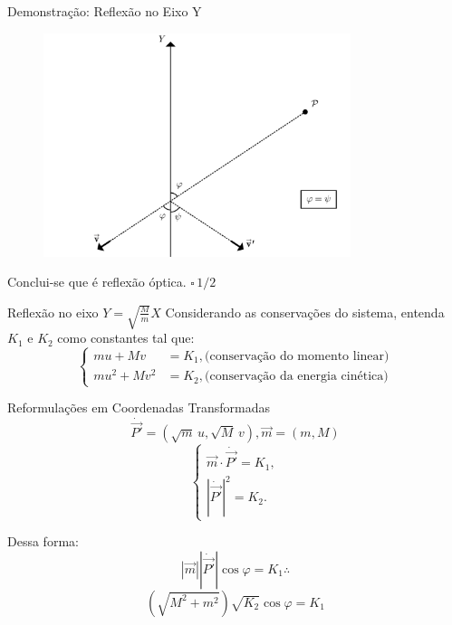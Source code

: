 \documentclass{beamer}
\begin{document}
\begin{frame}{Demonstração: Reflexão no Eixo Y}
  \begin{figure}
    \centering
    \includegraphics[width=0.8\textwidth]{images/image-4.png}
  \end{figure}
  Conclui-se que é reflexão óptica. $\square \, 1/2$ 
\end{frame}

\begin{frame}{Reflexão no eixo $Y=\sqrt{\tfrac{M}{m}}X$}
  Considerando as conservações do sistema, entenda $K_1$ e $K_2$ como constantes tal que:
  \begin{equation*}
    \begin{cases}mu+Mv&=K_1,\text{(conservação do momento linear)} \\mu^2+Mv^2&=K_2,\text{(conservação da energia cinética)} \end{cases}
  \end{equation*}
\end{frame}

\begin{frame}{Reformulações em Coordenadas Transformadas}
  $$\dot{\vec{P'}}=(\sqrt m\,u,\sqrt M\,v), \vec m=(m,M)$$
  \begin{equation*}
    \begin{cases}\vec m\cdot\dot{\vec{P'}}=K_1,\\|\dot{\vec{P'}}|^2=K_2.\end{cases}
  \end{equation*}

  Dessa forma:
  $$|\vec{m}| |\dot{\vec{P'}}| \cos{\varphi} = K_1 \therefore$$
  $$(\sqrt{M^2+m^2}) \sqrt{K_2} \cos{\varphi} = K_1$$
\end{frame}
\end{document}
